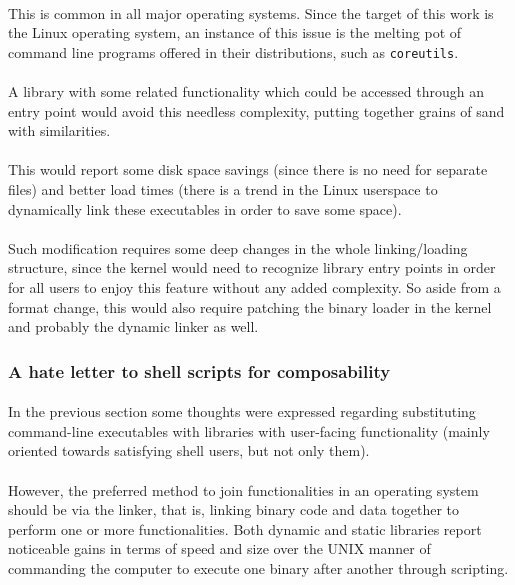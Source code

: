 \documentclass[12pt]{article}
\begin{document}
	\paragraph{}This is common in all major operating systems. Since the target of this work is the Linux operating system, an instance of this issue is the melting pot of command line programs offered in their distributions, such as \verb|coreutils|. 
	\paragraph{}A library with some related functionality which could be accessed through an entry point would avoid this needless complexity, putting together grains of sand with similarities.
	\paragraph{}This would report some disk space savings (since there is no need for separate files) and better load times (there is a trend in the Linux userspace to dynamically link these executables in order to save some space).
	\paragraph{}Such modification requires some deep changes in the whole linking/loading structure, since the kernel would need to recognize library entry points in order for all users to enjoy this feature without any added complexity.  So aside from a format change, this would also require patching the binary loader in the kernel and probably the dynamic linker as well.
	
	\subsubsection{A hate letter to shell scripts for composability}
	
	\paragraph{}In the previous section some thoughts were expressed regarding substituting command-line executables with libraries with user-facing functionality (mainly oriented towards satisfying shell users, but not only them).
	\paragraph{}However, the preferred method to join functionalities in an operating system should be via the linker, that is, linking binary code and data together to perform one or more functionalities. Both dynamic and static libraries report noticeable gains in terms of speed and size over the UNIX manner of commanding the computer to execute one binary after another through scripting.
\end{document}
